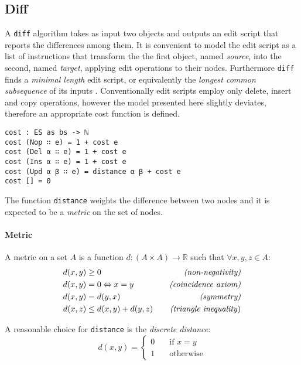 \documentclass[../Thesis.tex]{subfiles}
\begin{document}
	\subsection{Diff}
	\label{subsec:AlgoDiff}
	A \texttt{diff} algorithm takes as input two objects 
	and outputs an edit script that reports the differences among them.
	It is convenient to model the edit script as a list of instructions that
	transform the the first object, named \emph{source}, into the second,
	named \emph{target}, applying edit operations to their nodes.
	Furthermore \texttt{diff} finds a \emph{minimal length} edit script, or
	equivalently the \emph{longest common subsequence} of its inputs
	\cite{Berg00, PierceDiff3}.
	Conventionally edit scripts employ only delete, insert and copy operations,
	however the model presented here slightly deviates, therefore an 
	appropriate cost function is defined.
	
	
\begin{verbatim}
cost : ES as bs -> ℕ
cost (Nop ∷ e) = 1 + cost e
cost (Del α ∷ e) = 1 + cost e
cost (Ins α ∷ e) = 1 + cost e
cost (Upd α β ∷ e) = distance α β + cost e 
cost [] = 0
\end{verbatim}

	The function \texttt{distance} weights the difference between two nodes 
	and it is expected to be a \emph{metric} on the set of nodes.

	\paragraph{Metric}
	\label{par:Metric}
	A metric on a set $A$ is a function $d	 : (A \times A) \rightarrow \mathbb{R}$
	such that $\forall x, y, z \in A$:
	\begin{align*}
		d(x, y) &\geq 0 \quad &\mbox{\emph{{(non-negativity)}}}\\ 
		d(x, y) &= 0 \Leftrightarrow x = y \quad &\mbox{\emph{(coincidence axiom)}} \\		
		d(x, y) &= d(y, x) \quad &\mbox{\emph{(symmetry)}}\\
		d(x, z) &\leq d(x, y) + d(y, z) \quad &\mbox{\emph{(triangle inequality})}
	\end{align*}
	
	A reasonable choice for \texttt{distance} is the \emph{discrete distance}:
	\[ d(x, y) = 
		\begin{cases} 
			0 \quad &\mbox{if } x = y \\
			1 \quad &\mbox {otherwise}		
		\end{cases} \]
	
\end{document}
